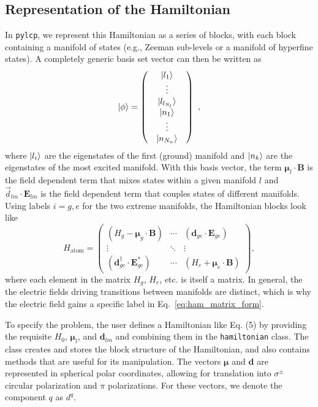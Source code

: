 \documentclass[final,5p,times,twocolumn]{elsarticle}
\begin{document}
\subsection{Representation of the Hamiltonian}
In {\tt pylcp}, we represent this Hamiltonian as a series of blocks, with each block containing a manifold of states (e.g., Zeeman sub-levels or a manifold of hyperfine states). A completely generic basis set vector can then be written as
\begin{equation}
    \ket{\phi} = \left(\begin{array}{c} \begin{array}{c} \ket{l_1} \\ \vdots \\ \ket{l_{l_{N_l}}} \end{array} \\ \begin{array}{c} \ket{n_1} \\ \vdots \\ \ket{n_{N_n}} \end{array} \end{array}\right)\ ,
\end{equation}
where $\ket{l_i}$ are the eigenstates of the first (ground) manifold and $\ket{n_k}$ are
the eigenstates of the most excited manifold.  With this basis vector, the term $\boldsymbol{\mu}_l\cdot\mathbf{B}$ is the field dependent term that mixes states within a given manifold $l$ and $\vec{d}_{lm}\cdot\mathbf{E}_{lm}$ is the field dependent term that couples states of different manifolds.  Using labels $i=g,e$ for the two extreme manifolds, the Hamiltonian blocks look like
\begin{equation}
    \label{eq:ham_matrix_form}
    H_\text{atom} = \left(
    \begin{array}{ccc}
    (H_g - \boldsymbol{\mu}_g\cdot \mathbf{B}) & \cdots & (\boldsymbol{d}_{ge}\cdot\mathbf{E}_{ge}) \\
    \vdots & \ddots & \vdots  \\
    (\boldsymbol{d}_{ge}^\dagger\cdot\mathbf{E}_{ge}^*) & \cdots & (H_e+\boldsymbol{\mu}_e\cdot \mathbf{B})
    \end{array}\right),
\end{equation}
where each element in the matrix $H_g$, $H_e$, etc. is itself a matrix.  In general, the the electric fields driving transitions between manifolds are distinct, which is why the electric field gains a specific label in Eq.~\ref{eq:ham_matrix_form}.

To specify the problem, the user defines a Hamiltonian like Eq. (5) by providing the requisite $H_0$, $\boldsymbol{\mu}_l$, and $\boldsymbol{d}_{lm}$ and combining them in the {\tt hamiltonian} class.  The class creates and stores the block structure of the Hamiltonian, and also contains methods that are useful for its manipulation.  The vectors $\boldsymbol{\mu}$ and $\boldsymbol{d}$ are represented in spherical polar coordinates, allowing for translation into $\sigma^{\pm}$ circular polarization and $\pi$ polarizations.  For these vectors, we denote the component $q$ as $d^q$.
\end{document}
